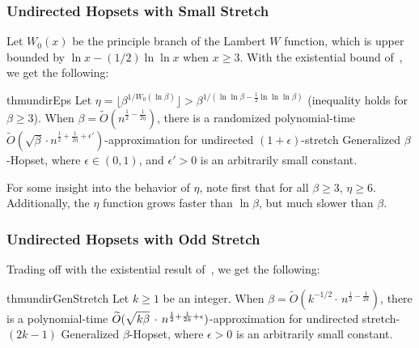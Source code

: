 \documentclass{article}
\theoremstyle{definition}
\theoremstyle{remark}
\def\be    {\beta}
\def\hopset {{\sc Generalized $\beta$-Hopset}}
\begin{document}
\subsubsection{Undirected Hopsets with Small Stretch}
Let $W_0(x)$ be the principle branch of the Lambert $W$ function, which is upper bounded by $\ln{x} - (1/2) \ln{\ln{x}}$ when $x \geq 3$. With the existential bound of~\cite{elkin2019RNC}, we get the following:
\begin{restatable}{thm}{undirEps} \label{thm:undir_eps}    
    Let $\eta = \lfloor \beta^{1/W_0(\ln{\beta})} \rfloor > \be^{1/(\ln{\ln{\be}}-\frac{1}{2}\ln{\ln{\ln{\be}}})}$ (inequality holds for $\be \geq 3$). When $\beta = \widetilde{O}(n^{\frac{1}{2} - \frac{1}{2\eta}})$, there is a randomized polynomial-time $\widetilde{O}(\sqrt{\be} \cdot n^{\frac{1}{2} + \frac{1}{2\eta} + \epsilon'})$-approximation for undirected $(1+\epsilon)$-stretch {\hopset}, where $\epsilon \in (0,1)$, and $\epsilon' > 0$ is an arbitrarily small constant.
\end{restatable}
For some insight into the behavior of $\eta$, note first that for all $\beta \geq 3$, $\eta \geq 6$. Additionally, the $\eta$ function grows faster than $\ln{\be}$, but much slower than $\be$.


\subsubsection{Undirected Hopsets with Odd Stretch}
Trading off with the existential result of~\cite{TZ05}, we get the following:
\begin{restatable}{thm}{undirGenStretch} \label{thm:undir_gen_stretch}
    Let $k \geq 1$ be an integer. When $\be = \widetilde{O}(k^{-1/2} \cdot \, n^{\frac{1}{2} - \frac{1}{2k}}) $, there is a polynomial-time $\widetilde{O}(\sqrt{k \be \vphantom{\be^k}} \, \cdot \, n^{\frac{1}{2} + \frac{1}{2k} + \epsilon})$-approximation for undirected stretch-$(2k-1)$ {\hopset}, where $\epsilon > 0$ is an arbitrarily small constant.
\end{restatable}

\fi
\end{document}
